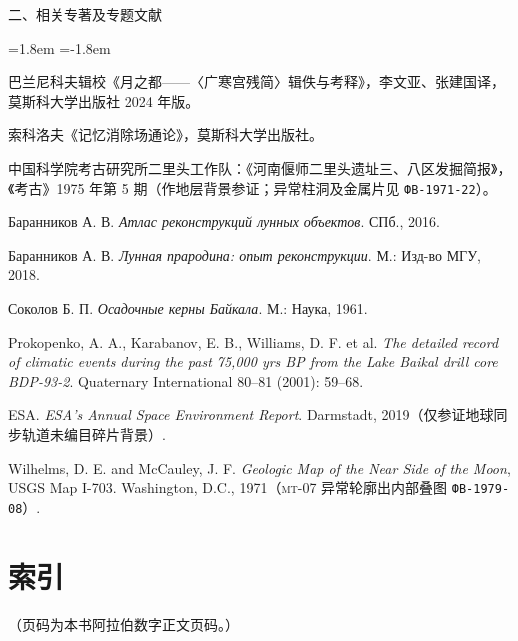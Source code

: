 \vspace{4mm}
二、相关专著及专题文献
\par\vspace{1.5mm}
\begin{list}{}{\leftmargin=1.8em \itemindent=-1.8em \topsep=0pt \parsep=1.4pt \itemsep=0pt}
\item 巴兰尼科夫辑校《月之都——〈广寒宫残简〉辑佚与考释》，李文亚、张建国译，莫斯科大学出版社 2024 年版。
\item 索科洛夫《记忆消除场通论》，莫斯科大学出版社。
\item 中国科学院考古研究所二里头工作队：《河南偃师二里头遗址三、八区发掘简报》，《考古》1975 年第 5 期（作地层背景参证；异常柱洞及金属片见 \texttt{ФВ-1971-22}）。
\item Баранников А. В. \textit{Атлас реконструкций лунных объектов}. СПб., 2016.
\item Баранников А. В. \textit{Лунная прародина: опыт реконструкции}. М.: Изд-во МГУ, 2018.
\item Соколов Б. П. \textit{Осадочные керны Байкала}. М.: Наука, 1961.
\item Prokopenko, A. A., Karabanov, E. B., Williams, D. F. et al. \textit{The detailed record of climatic events during the past 75,000 yrs BP from the Lake Baikal drill core BDP-93-2}. Quaternary International 80–81 (2001): 59–68.
\item ESA. \textit{ESA’s Annual Space Environment Report}. Darmstadt, 2019（仅参证地球同步轨道未编目碎片背景）.
\item Wilhelms, D. E. and McCauley, J. F. \textit{Geologic Map of the Near Side of the Moon}, USGS Map I-703. Washington, D.C., 1971（\textsc{mt}-07 异常轮廓出内部叠图 \texttt{ФВ-1979-08}）.
\end{list}
\endgroup

\clearpage
\chapter*{索\quad 引}
{}

{\footnotesize\color{pencil}（页码为本书阿拉伯数字正文页码。）\par{}}
\vspace{2mm}


